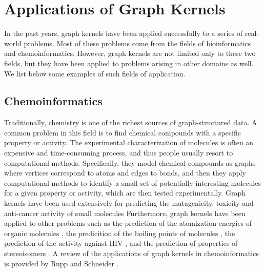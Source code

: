 \documentclass[twoside,11pt]{article}
\begin{document}
\section{Applications of Graph Kernels}\label{sec:applications}
In the past years, graph kernels have been applied successfully to a series of real-world problems.
Most of these problems come from the fields of bioinformatics and chemoinformatics.
However, graph kernels are not limited only to these two fields, but they have been applied to problems arising in other domains as well.
We list below some examples of such fields of application.

\subsection{Chemoinformatics}
Traditionally, chemistry is one of the richest sources of graph-structured data.
A common problem in this field is to find chemical compounds with a specific property or activity.
The experimental characterization of molecules is often an expensive and time-consuming process, and thus people usually resort to computational methods.
Specifically, they model chemical compounds as graphs where vertices correspond to atoms and edges to bonds, and then they apply computational methods to identify a small set of potentially interesting molecules for a given property or activity, which are then tested experimentally.
Graph kernels have been used extensively for predicting the mutagenicity, toxicity and anti-cancer activity of small molecules \cite{swamidass2005kernels,ralaivola2005graph,mahe2005graph,ceroni2007classification,mahe2009graph,smalter2009graph}
Furthermore, graph kernels have been applied to other problems such as the prediction of the atomization energies of organic molecules \cite{ferre2017learning}, the predicition of the boiling points of molecules \cite{gauzere2011two}, the prediction of the activity against HIV \cite{gauzere2011two}, and the prediction of properties of stereoisomers \cite{brown2010compound,grenier2017chemoinformatics}.
A review of the applications of graph kernels in chemoinformatics is provided by Rupp and Schneider \citeyear{rupp2010graph}.
\end{document}
